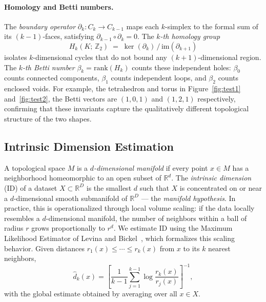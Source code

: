 \paragraph{Homology and Betti numbers.}
The \emph{boundary operator} $\partial_k : C_k \to C_{k-1}$ maps each
$k$-simplex to the formal sum of its $(k-1)$-faces, satisfying
$\partial_{k-1} \circ \partial_k = 0$. The \emph{$k$-th homology group}
\begin{equation}
    H_k(K;\,\mathbb{Z}_2) \;=\; \ker(\partial_k)\,/\,\mathrm{im}(\partial_{k+1})
\end{equation}
isolates $k$-dimensional cycles that do not bound any $(k+1)$-dimensional
region. The \emph{$k$-th Betti number} $\beta_k = \mathrm{rank}(H_k)$
counts these independent holes: $\beta_0$ counts connected components,
$\beta_1$ counts independent loops, and $\beta_2$ counts enclosed voids.
For example, the tetrahedron and torus in Figure~\ref{fig:test1} and~\ref{fig:test2},
the Betti vectors are $(1,0,1)$ and $(1,2,1)$ respectively, confirming that these invariants capture the qualitatively different topological
structure of the two shapes. 


\subsection{Intrinsic Dimension Estimation}
\label{subsec:id}

A topological space $M$ is a \emph{$d$-dimensional manifold} if every point $x \in M$ has a neighborhood homeomorphic to an open subset of $\mathbb{R}^d$. The \emph{intrinsic dimension} (ID) of a dataset $X \subset \mathbb{R}^D$ is the smallest $d$ such that $X$ is concentrated on or near a $d$-dimensional smooth submanifold of $\mathbb{R}^D$ --- the \emph{manifold hypothesis}. In practice, this is operationalized through local volume scaling: if the data locally resembles a $d$-dimensional manifold, the number of neighbors within a ball of radius $r$ grows proportionally to $r^d$. We estimate ID using the Maximum Likelihood Estimator of Levina and
Bickel~\cite{LevinaBickel}, which formalizes this scaling behavior. Given distances $r_1(x) \leq \cdots
\leq r_k(x)$ from $x$ to its $k$ nearest neighbors,
\begin{equation}
    \hat{d}_k(x) = \left[
        \frac{1}{k-1} \sum_{j=1}^{k-1}
        \log \frac{r_k(x)}{r_j(x)}
    \right]^{-1},
    \label{eq:mle_id}
\end{equation}
with the global estimate obtained by averaging over all $x \in X$.

